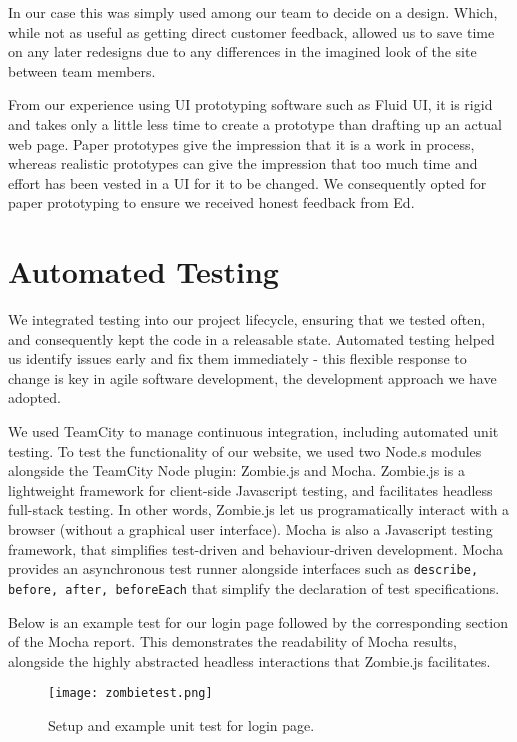 In our case this was simply used among our team to decide on a design. Which, while not as useful as getting direct customer feedback, allowed us to save time on any later redesigns due to any differences in the imagined look of the site between team members. 

From our experience using UI prototyping software such as Fluid UI, it is rigid and takes only a little less time to create a prototype than drafting up an actual web page. Paper prototypes give the impression that it is a work in process, whereas realistic prototypes can give the impression that too much time and effort has been vested in a UI for it to be changed. We consequently opted for paper prototyping to ensure we received honest feedback from Ed.


\section{Automated Testing}

We integrated testing into our project lifecycle, ensuring that we tested often, and consequently kept the code in a releasable state. Automated testing helped us identify issues early and fix them immediately - this flexible response to change is key in agile software development, the development approach we have adopted. 

We used TeamCity\cite{teamcity} to manage continuous integration, including automated unit testing. To test the functionality of our website, we used two Node.s modules alongside the TeamCity Node plugin\cite{teamcitynode}: Zombie.js\cite{zombie} and Mocha\cite{mocha}. Zombie.js is a lightweight framework for client-side Javascript testing, and facilitates headless full-stack testing. In other words, Zombie.js let us programatically interact with a browser (without a graphical user interface). Mocha is also a Javascript testing framework, that simplifies test-driven and behaviour-driven development. Mocha provides an asynchronous test runner alongside interfaces such as {\tt describe, before, after, beforeEach} that simplify the declaration of test specifications.

Below is an example test for our login page followed by the corresponding section of the Mocha report. This demonstrates the readability of Mocha results, alongside the highly abstracted headless interactions that Zombie.js facilitates.  

\begin{figure}[H]
\centering
\texttt{[image: zombietest.png]}
\caption{Setup and example unit test for login page.}
\end{figure}


